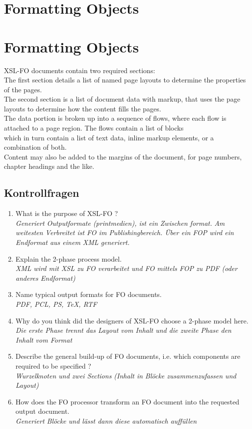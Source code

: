 \chapter{Formatting Objects}


\chapter{Formatting Objects}
XSL-FO documents contain two required sections:\\
The first section details a list of named page layouts to determine the properties of the pages.\\
The second section is a list of document data with markup, that uses the page layouts to determine how the content fills the pages.\\
The data portion is broken up into a sequence of flows, where each flow is attached to a page region. The flows contain a list of blocks\\
which in turn contain a list of text data, inline markup elements, or a combination of both.\\
Content may also be added to the margins of the document, for page numbers, chapter headings and the like.\\



\section{Kontrollfragen}
\begin{enumerate}
\item What is the purpose of XSL-FO ?\\
\textit{Generiert Outputformate (printmedien), ist ein Zwischen format.}
\textit{Am weitesten Verbreitet ist FO im Publishingbereich. Über ein FOP wird ein Endformat aus einem XML generiert.
}


\item Explain the 2-phase process model.\\
\textit{XML wird mit XSL zu FO verarbeitet und FO mittels FOP zu PDF (oder anderes Endformat)}

\item Name typical output formats for FO documents.\\
\textit{PDF, PCL, PS, TeX, RTF}

\item Why do you think did the designers of XSL-FO choose a 2-phase model here.\\
\textit{Die erste Phase trennt das Layout vom Inhalt und die zweite Phase den Inhalt vom Format}


\item Describe the general build-up of FO documents, i.e. which components are required to be specified ?\\
\textit{Wurzelknoten und zwei Sections (Inhalt in Blöcke zusammenzufassen und Layout)}

\item How does the FO processor transform an FO document into the requested output document.\\
\textit{Generiert Blöcke und lässt dann diese automatisch auffüllen}

\end{enumerate}

